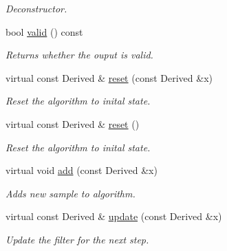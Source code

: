 \begin{DoxyCompactItemize}
\begin{DoxyCompactList}\small\item\em Deconstructor. \end{DoxyCompactList}\item 
bool \hyperlink{classow__core_1_1MatrixAlgorithm_aae232e195def27fd3e9d348362371f3a}{valid} () const 
\begin{DoxyCompactList}\small\item\em Returns whether the ouput is valid. \end{DoxyCompactList}\item 
virtual const Derived \& \hyperlink{classow__core_1_1MatrixAlgorithm_aa916ab91a2023c53ea1d1322ed7fbc0d}{reset} (const Derived \&x)
\begin{DoxyCompactList}\small\item\em Reset the algorithm to inital state. \end{DoxyCompactList}\item 
virtual const Derived \& \hyperlink{classow__core_1_1MatrixAlgorithm_a67afa50413e22a46adcb8c228044467f}{reset} ()
\begin{DoxyCompactList}\small\item\em Reset the algorithm to inital state. \end{DoxyCompactList}\item 
virtual void \hyperlink{classow__core_1_1MatrixAlgorithm_acb46c0c4321418b113b0e47b35d97049}{add} (const Derived \&x)
\begin{DoxyCompactList}\small\item\em Adds new sample to algorithm. \end{DoxyCompactList}\item 
virtual const Derived \& \hyperlink{classow__core_1_1MatrixAlgorithm_a21bfb1e0ada4dceafd763578cddd12f6}{update} (const Derived \&x)\hypertarget{classow__core_1_1MatrixAlgorithm_a21bfb1e0ada4dceafd763578cddd12f6}{}\label{classow__core_1_1MatrixAlgorithm_a21bfb1e0ada4dceafd763578cddd12f6}

\begin{DoxyCompactList}\small\item\em Update the filter for the next step. \end{DoxyCompactList}\end{DoxyCompactItemize}
